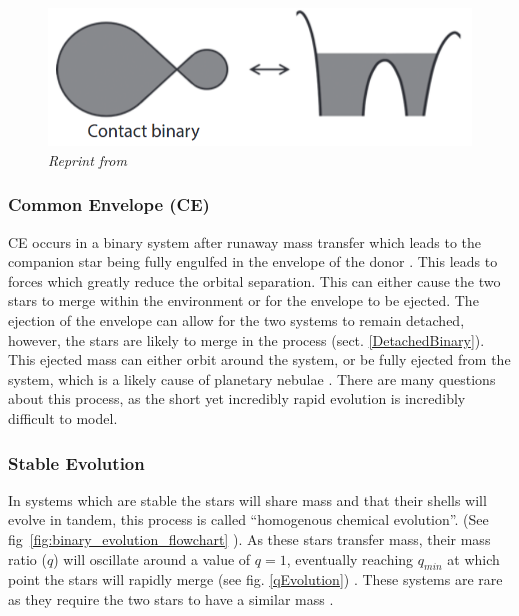 \documentclass[12pt, a4paper]{article}
\begin{document}
        \begin{figure}
            \centering
            \includegraphics[scale = .4]{Figs/reused-figs/Tauris_ContactBinary.png}

            \caption{\textit{Reprint from~\parencite{TaurisvandenHeuvel+2023}}}
            \label{ContactBinaryRL}
        \end{figure}
        
        \subsubsection{Common Envelope (CE)}\label{CommonEnvelope}

            CE occurs in a binary system after runaway mass transfer which leads to the companion star being fully engulfed in the envelope of the donor \cite{TaurisvandenHeuvel+2023}. This leads to forces which greatly reduce the orbital separation. This can either cause the two stars to merge within the environment or for the envelope to be ejected. The ejection of the envelope can allow for the two systems to remain detached, however, the stars are likely to merge in the process \cite{TaurisvandenHeuvel+2023} (sect. \ref{DetachedBinary}). This ejected mass can either orbit around the system, or be fully ejected from the system, which is a likely cause of planetary nebulae \parencite{TaurisvandenHeuvel+2023}. There are many questions about this process, as the short yet incredibly rapid evolution is incredibly difficult to model. \cite{TaurisvandenHeuvel+2023}

        \subsubsection{Stable Evolution}\label{CommonEnvelopeStableEvoluton}
            In systems which are stable the stars will share mass and that their shells will evolve in tandem, this process is called ``homogenous chemical evolution''. (See fig~\ref{fig:binary_evolution_flowchart} \parencite{Chen_2024}). As these stars transfer mass, their mass ratio ($q$) will oscillate around a value of $q=1$, eventually reaching $q_{min}$ at which point the stars will rapidly merge (see fig. \ref{qEvolution}) \parencite{Pešta_2023}. These systems are rare as they require the two stars to have a similar mass \parencite{TaurisvandenHeuvel+2023}. 
            
\end{document}
